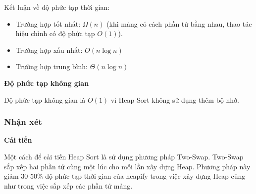Kết luận về độ phức tạp thời gian:

 \begin{itemize}
    \item Trường hợp tốt nhất: $\Omega(n)$ (khi mảng có cách phần tử bằng nhau, thao tác hiệu chỉnh có độ phức tạp $O(1)$).
    \item Trường hợp xấu nhất: $O(n\log{n})$
    \item Trường hợp trung bình: $\Theta(n\log{n})$
\end{itemize}

\textbf{Độ phức tạp không gian}

Độ phức tạp không gian là $O(1)$ vì Heap Sort không sử dụng thêm bộ nhớ.

\subsubsection{Nhận xét}

\textbf{Cải tiến} 

Một cách để cải tiến Heap Sort là sử dụng phương pháp Two-Swap. Two-Swap sắp xếp hai phần tử cùng một lúc cho mỗi lần xây dựng Heap. Phương pháp này giảm 30-50\% độ phức tạp thời gian của heapify trong việc xây dựng Heap cũng như trong việc sắp xếp các phần tử mảng. \cite{10.1007/978-3-319-11933-5_78}
